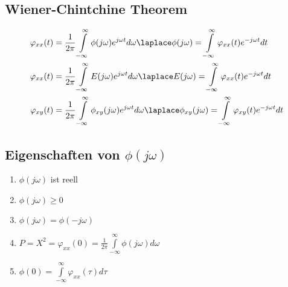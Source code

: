\subsection{Wiener-Chintchine Theorem}
	\begin{align}
		\varphi_{xx}(t) &= \frac{1}{2\pi}\int\limits_{-\infty}^{\infty}\phi(j\omega)e^{j\omega t}d\omega \laplace
			\phi(j\omega) = \int\limits_{-\infty}^{\infty}\varphi_{xx}(t)e^{-j\omega t} dt \nonumber \\
		\varphi_{xx}(t) &= \frac{1}{2\pi}\int\limits_{-\infty}^{\infty}E(j\omega)e^{j\omega t}d\omega \laplace
			E(j\omega) = \int\limits_{-\infty}^{\infty}\varphi_{xx}(t)e^{-j\omega t} dt \nonumber \\
		\varphi_{xy}(t) &= \frac{1}{2\pi}\int\limits_{-\infty}^{\infty}\phi_{xy}(j\omega)e^{j\omega t}d\omega \laplace
			\phi_{xy}(j\omega) = \int\limits_{-\infty}^{\infty}\varphi_{xy}(t)e^{-j\omega t} dt \nonumber
	\end{align}
	
\subsection{Eigenschaften von $\phi(j\omega)$}
	\begin{enumerate}
		\item	$\phi(j\omega)$ ist reell
		\item $\phi(j\omega) \geq 0$
		\item $\phi(j\omega) = \phi(-j\omega)$
		\item $P = X^2 = \varphi_{xx}(0) = \frac{1}{2\pi} \int\limits_{-\infty}^{\infty} \phi(j\omega) d\omega$
		\item $\phi(0) = \int\limits_{-\infty}^{\infty} \varphi_{xx}(\tau)d\tau$
	\end{enumerate}